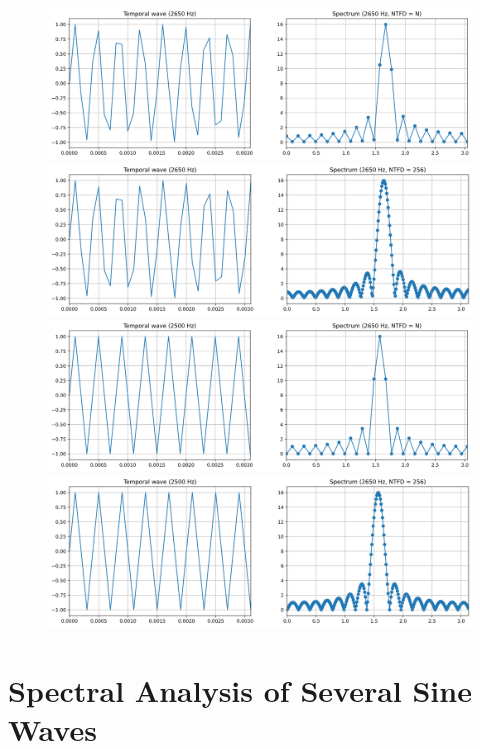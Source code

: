 \documentclass[]{article}
\begin{document}
\begin{figure}[H]
    \centering
\includegraphics[scale=0.25]{q31.png}\\
\includegraphics[scale=0.25]{q32.png}\\
\includegraphics[scale=0.25]{q33.png}\\
\includegraphics[scale=0.25]{q34.png}\\
\end{figure}

\section{Spectral Analysis of Several Sine Waves}
\end{document}
